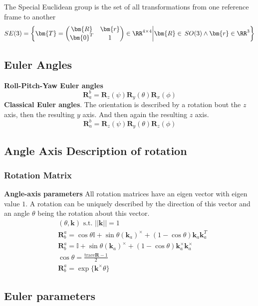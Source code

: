 The Special Euclidean group is the set of all transformations from one reference frame to another
\[
SE(3) = \left\{\bm{T} = \begin{pmatrix}\bm{R} & \bm{r} \\ \bm{0}^T & 1 \end{pmatrix}\in\RR^{4\times4}\middle|\bm{R}\in\,SO(3) \wedge \bm{r}\in\RR^3\right\}
\]

\setcounter{subsection}{4}
\subsection{Euler Angles} %


\textbf{Roll-Pitch-Yaw Euler angles}
\[\bm{R}_a^b = \bm{R}_z(\psi)\bm{R}_y(\theta)\bm{R}_x(\phi)\]
\textbf{Classical Euler angles}. The orientation is described by a rotation bout the \(z\) axis, then the resulting \(y\) axis. And then again the resulting \(z\) axis.
\[\bm{R}_a^b = \bm{R}_z(\psi)\bm{R}_y(\theta)\bm{R}_z(\phi)\]

\subsection{Angle Axis Description of rotation} %
\setcounter{subsubsection}{4}
\subsubsection{Rotation Matrix}

\textbf{Angle-axis parameters} All rotation matrices have an eigen vector with eigen value \(1\). A rotation can be uniquely described by the direction of this vector and an angle \(\theta\) being the rotation about this vector.
\begin{align*}
    & (\theta,\bm{k})\text{ s.t. }||\bm{k}|| = 1 \\
    & \bm{R}_b^a = \cos\theta\mathbb{I} + \sin\theta(\bm{k}_a)^\times + (1-\cos\theta)\bm{k}_a\bm{k}_a^T \\
    & \bm{R}_b^a = \mathbb{I} + \sin\theta(\bm{k}_a)^\times + (1-\cos\theta)\bm{k}_a^\times\bm{k}_a^\times \\
    & \cos \theta = \frac{\textrm{trace}\bm{R}-1}{2} \\
    & \bm{R}_b^a = \exp\{\bm{k}^\times\theta\}
\end{align*}

\subsection{Euler parameters} %
